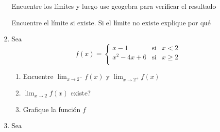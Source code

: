 \documentclass[10pt,twoside]{article}
\begin{document}
\begin{enumerate}
Encuentre los l\'{i}mites y luego use geogebra para verificar el resultado
Encuentre el límite si existe. Si el límite no existe explique por qué
\item Sea 
\[f(x)=\left\{ \begin{array}{lcl}
x-1 & \mbox{si} & x<2\\
x^{2}-4x+6 & \mbox{si} & x \geq 2\\
\end{array}
\right. \]
\begin{enumerate}
\item Encuentre $\displaystyle{\lim_{x\rightarrow 2^{-}}}f(x)$ y $\displaystyle{\lim_{x\rightarrow 2^{+}}}f(x)$
\item $\displaystyle{\lim_{x\rightarrow 2}}f(x)$ existe?
\item Grafique la función $f$
\end{enumerate}
\item Sea

\end{enumerate}
\end{document}
